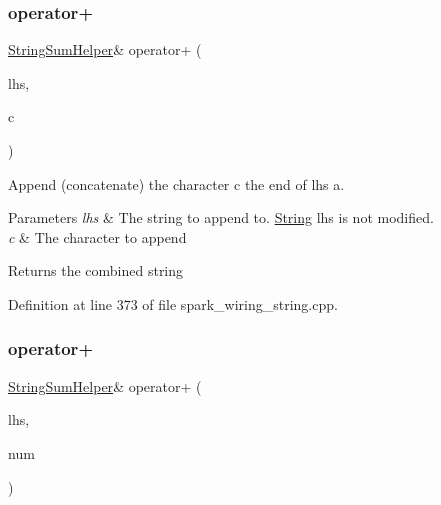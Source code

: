 \mbox{\label{class_string_a15c2c0bbe928e2bbf5278c8537bcfda4}} 
\subsubsection{\texorpdfstring{operator+}{operator+}\hspace{0.1cm}{\footnotesize\ttfamily [3/10]}}
{\footnotesize\ttfamily \hyperlink{class_string_sum_helper}{String\+Sum\+Helper}\& operator+ (\begin{DoxyParamCaption}\item[{const \hyperlink{class_string_sum_helper}{String\+Sum\+Helper} \&}]{lhs,  }\item[{char}]{c }\end{DoxyParamCaption})\hspace{0.3cm}{\ttfamily [friend]}}



Append (concatenate) the character c the end of lhs a. 


\begin{DoxyParams}{Parameters}
{\em lhs} & The string to append to. \hyperlink{class_string}{String} lhs is not modified.\\
\hline
{\em c} & The character to append\\
\hline
\end{DoxyParams}
\begin{DoxyReturn}{Returns}
the combined string 
\end{DoxyReturn}


Definition at line 373 of file spark\+\_\+wiring\+\_\+string.\+cpp.

\mbox{\label{class_string_a8b0c50963eaaf2366de418e1fba34cf1}} 
\subsubsection{\texorpdfstring{operator+}{operator+}\hspace{0.1cm}{\footnotesize\ttfamily [4/10]}}
{\footnotesize\ttfamily \hyperlink{class_string_sum_helper}{String\+Sum\+Helper}\& operator+ (\begin{DoxyParamCaption}\item[{const \hyperlink{class_string_sum_helper}{String\+Sum\+Helper} \&}]{lhs,  }\item[{unsigned char}]{num }\end{DoxyParamCaption})\hspace{0.3cm}{\ttfamily [friend]}}



